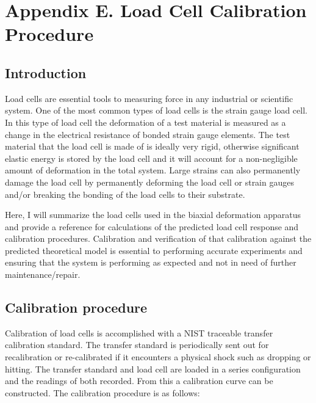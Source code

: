 \chapter*{Appendix E. Load Cell Calibration Procedure}

\section{Introduction}

Load cells are essential tools to measuring force in any industrial or
scientific system. One of the most common types of load cells is the strain
gauge load cell. In this type of load cell the deformation of a test material is
measured as a change in the electrical resistance of bonded strain gauge
elements. The test material that the load cell is made of is ideally very rigid,
otherwise significant elastic energy is stored by the load cell and it will
account for a non-negligible amount of deformation in the total system. Large
strains can also permanently damage the load cell by permanently deforming the
load cell or strain gauges and/or breaking the bonding of the load cells to
their substrate.

Here,  I will summarize the load cells used in the biaxial deformation apparatus
and provide a reference for calculations of the predicted load cell response and
calibration procedures. Calibration and verification of that calibration against
the predicted theoretical model is essential to performing accurate experiments
and ensuring that the system is performing as expected and not in need of
further maintenance/repair. 

\section{Calibration procedure}
Calibration of load cells is accomplished with a NIST traceable transfer
calibration standard. The transfer standard is periodically sent out for
recalibration or re-calibrated if it encounters a physical shock such as dropping
or hitting. The transfer standard and load cell are loaded in a series
configuration and the readings of both recorded. From this a calibration curve
can be constructed. The calibration procedure is as follows:

